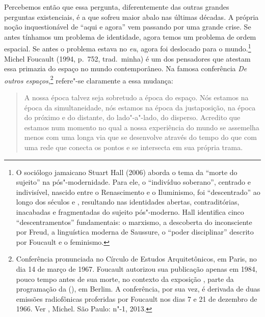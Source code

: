 Percebemos então que essa pergunta, diferentemente das outras grandes
perguntas existenciais, é a que sofreu maior abalo nas últimas décadas.
A própria noção inquestionável de ``aqui e agora'' vem passando por uma grande crise. Se antes tínhamos um problema de identidade, agora temos um
problema de ordem espacial. Se antes o problema estava no \emph{eu},
agora foi deslocado para o mundo.\footnote{O sociólogo jamaicano Stuart
  Hall (2006) aborda o tema da ``morte do sujeito'' na pós"-modernidade.
  Para ele, o ``indivíduo soberano'', centrado e indivisível, nascido
  entre o Renascimento e o Iluminismo, foi ``descentrado'' ao longo dos
  séculos  e , resultando nas identidades abertas, contraditórias,
  inacabadas e fragmentadas do sujeito pós"-moderno. Hall identifica
  cinco ``descentramentos'' fundamentais: o marxismo, a descoberta do
  inconsciente por Freud, a linguística moderna de Saussure, o ``poder
  disciplinar'' descrito por Foucault e o feminismo.} Michel Foucault
(1994, p.~752, trad.~minha) é
um dos pensadores que atestam essa primazia do espaço no mundo
contemporâneo. Na famosa conferência \emph{De outros espaços},\footnote{Conferência
  pronunciada no Círculo de Estudos Arquitetônicos, em Paris, no dia 14
  de março de 1967. Foucault autorizou sua publicação apenas em 1984,
  pouco tempo antes de sua morte, no contexto da exposição {}, parte da programação da {} (), em Berlim. A conferência, por sua vez, é
  derivada de duas emissões radiofônicas proferidas por Foucault nos
  dias 7 e 21 de dezembro de 1966. Ver , Michel. {} São Paulo: n"-1, 2013.} refere"-se claramente
a essa mudança:

\begin{quote}
A nossa época talvez seja sobretudo a época do espaço. Nós estamos na
época da simultaneidade, nós estamos na época da justaposição, na época
do próximo e do distante, do lado"-a"-lado, do disperso. Acredito que
estamos num momento no qual a nossa experiência do mundo se assemelha
menos com uma longa via que se desenvolve através do tempo do que com
uma rede que conecta os pontos e se intersecta em sua própria trama.
\end{quote}

